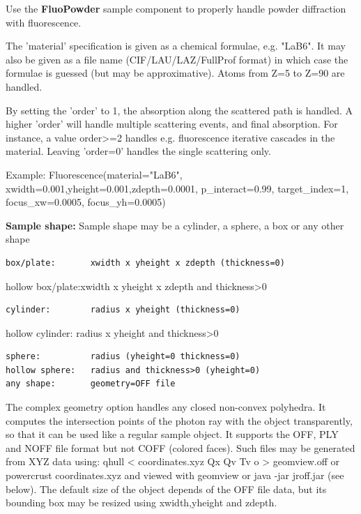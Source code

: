Use the \textbf{FluoPowder} sample component to properly handle powder diffraction with fluorescence.

The 'material' specification is given as a chemical formulae, e.g. "LaB6". It may also be given as a file name (CIF/LAU/LAZ/FullProf format) in which case the formulae is guessed (but may be approximative). Atoms from Z=5 to Z=90 are handled.

By setting the 'order' to 1, the absorption along the scattered path is handled. A higher 'order' will handle multiple scattering events, and final absorption. For instance, a value order\textgreater{}=2 handles e.g. fluorescence iterative cascades in the material. Leaving 'order=0' handles the single scattering only.

Example: Fluorescence(material="LaB6", xwidth=0.001,yheight=0.001,zdepth=0.0001, p\_interact=0.99, target\_index=1, focus\_xw=0.0005, focus\_yh=0.0005)

\textbf{Sample shape:} Sample shape may be a cylinder, a sphere, a box or any other shape

\begin{verbatim}
box/plate:       xwidth x yheight x zdepth (thickness=0)
\end{verbatim}

hollow box/plate:xwidth x yheight x zdepth and thickness\textgreater{}0

\begin{verbatim}
cylinder:        radius x yheight (thickness=0)
\end{verbatim}

hollow cylinder: radius x yheight and thickness\textgreater{}0

\begin{verbatim}
sphere:          radius (yheight=0 thickness=0)
hollow sphere:   radius and thickness>0 (yheight=0)
any shape:       geometry=OFF file
\end{verbatim}

The complex geometry option handles any closed non-convex polyhedra. It computes the intersection points of the photon ray with the object transparently, so that it can be used like a regular sample object. It supports the OFF, PLY and NOFF file format but not COFF (colored faces). Such files may be generated from XYZ data using: qhull \textless{} coordinates.xyz Qx Qv Tv o \textgreater{} geomview.off or powercrust coordinates.xyz and viewed with geomview or java -jar jroff.jar (see below). The default size of the object depends of the OFF file data, but its bounding box may be resized using xwidth,yheight and zdepth.

